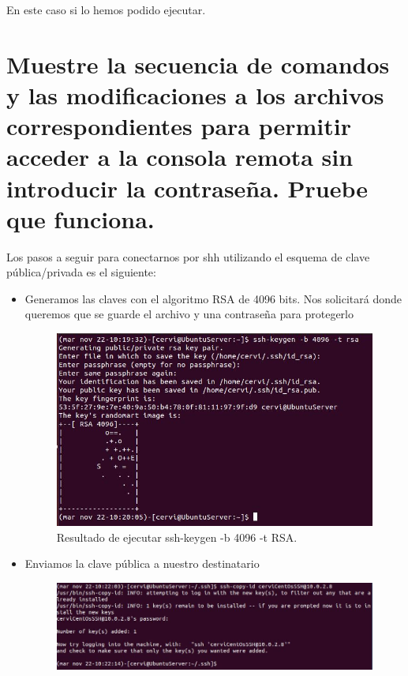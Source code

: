 En este caso si lo hemos podido ejecutar.
\newpage
\section{Muestre la secuencia de comandos y las modificaciones a los archivos correspondientes para permitir acceder a la consola remota sin introducir la contraseña. Pruebe que funciona.}

Los pasos a seguir para conectarnos por shh utilizando el esquema de clave pública/privada es el siguiente:\newline
\begin{itemize}
	\item Generamos las claves con el algoritmo RSA de 4096 bits. Nos solicitará donde queremos que se guarde el archivo y una contraseña para protegerlo \newline
	\begin{figure}[H]
		\centering
		\includegraphics[scale=0.85]{ssh-keygen.jpg}
		\caption{Resultado de ejecutar ssh-keygen -b 4096 -t RSA. \label{fig:figura12}}
	\end{figure}
	\item Enviamos la clave pública a nuestro destinatario
		\begin{figure}[H]
		\centering
		\includegraphics[scale=0.69]{ssh-copy-id.jpg}

\end{figure}
\end{itemize}
